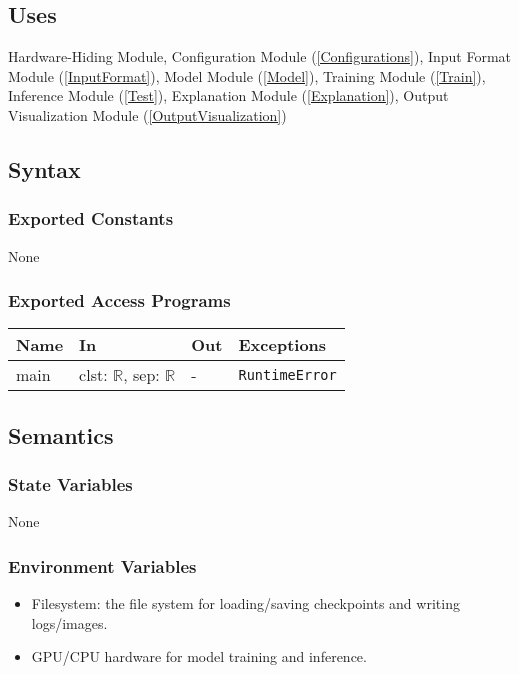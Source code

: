 \documentclass[12pt, titlepage]{article}
\begin{document}
\subsection{Uses}
Hardware-Hiding Module, Configuration Module (\ref{Configurations}), Input Format Module (\ref{InputFormat}), Model Module (\ref{Model}), Training Module (\ref{Train}), Inference Module (\ref{Test}), 
Explanation Module (\ref{Explanation}), Output Visualization Module (\ref{OutputVisualization})

\subsection{Syntax}

\subsubsection{Exported Constants}
None

\subsubsection{Exported Access Programs}

\begin{center}
\begin{tabular}{p{3cm} p{6cm} p{4.5cm} p{3cm}}
\hline
\textbf{Name} & \textbf{In} & \textbf{Out} & \textbf{Exceptions} \\
\hline
main & clst: \(\mathbb{R}\), sep: \(\mathbb{R}\) & - & \texttt{RuntimeError} \\
\hline
\end{tabular}
\end{center}

\subsection{Semantics}

\subsubsection{State Variables}
None

\subsubsection{Environment Variables}
\begin{itemize}
  \item Filesystem: the file system for loading/saving checkpoints and writing logs/images.
  \item GPU/CPU hardware for model training and inference.
\end{itemize}
\end{document}
